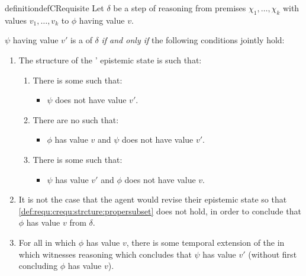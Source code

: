 \begin{note}
  \begin{restatable}{definition}{defCRequisite}
    \label{def:requ:crequ}
    Let \(\delta\) be a step of reasoning from premises \(\chi_{1},\dots,\chi_{k}\) with values \(v_{1},\dots,v_{k}\) to \(\phi\) having value \(v\).

    \(\psi\) having value \(v'\) is a \emph{\crequ{}} of \(\delta\) \emph{if and only if} the following conditions jointly hold:
    \begin{enumerate}[label=\arabic*., ref=\named{\ddag C\(\Re\):\arabic*}]
    \item
      \label{def:requ:crequ:strcture}
      The structure of the \vAgent{}' epistemic state is such that:
      \begin{enumerate}[label=\alph*., ref=\named{\ddag C\(\Re\):1\alph*}]
      \item
        \label{def:requ:crequ:strcture:psi-not-v}
        There is some \epVW{} such that:
        \begin{itemize}
        \item
          \(\psi\) does not have value \(v'\).
        \end{itemize}
      \item
        \label{def:requ:crequ:strcture:subset}
        There are no  such that:
        \begin{itemize}
        \item \(\phi\) has value \(v\) and \(\psi\) does not have value \(v'\).
        \end{itemize}
      \item
        \label{def:requ:crequ:strcture:propersubset}
        There is some \epVW{} such that:
        \begin{itemize}
        \item \(\psi\) has value \(v'\) and \(\phi\) does not have value \(v\).
        \end{itemize}
      \end{enumerate}
    \item
      \label{def:requ:crequ:no-revision}
      It is not the case that the agent would revise their epistemic state so that \ref{def:requ:crequ:strcture:propersubset} does not hold, in order to conclude that \(\phi\) has value \(v\) from \(\delta\).
    \item
      \label{def:requ:crequ:possible-reason}
      For all \epVW{} in which \(\phi\) has value \(v\), there is some temporal extension of the \world{} in which \vAgent{} witnesses reasoning which concludes that \(\psi\) has value \(v'\) (without first concluding \(\phi\) has value \(v\)).
    \end{enumerate}
    \vspace{-\baselineskip}
  \end{restatable}
\end{note}

